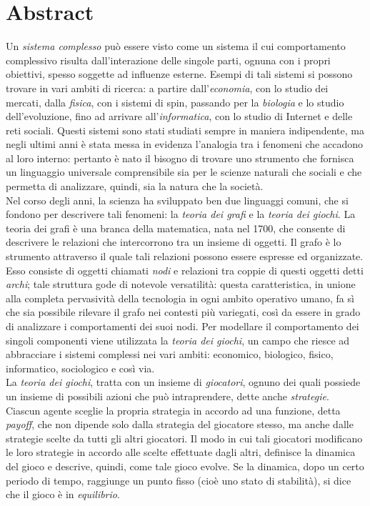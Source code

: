 \documentclass[11pt,oneside]{book}
\theoremstyle{plain}
\begin{document}


\vfill


\chapter*{Abstract}
Un \textit{sistema complesso} può essere visto come un sistema il cui comportamento complessivo risulta dall’interazione delle singole parti, ognuna con i propri obiettivi, spesso soggette ad influenze esterne. Esempi di tali sistemi si possono trovare in vari ambiti di ricerca: a partire dall’\textit{economia}, con lo studio dei mercati, dalla \textit{fisica}, con i sistemi di spin, passando per la \textit{biologia} e lo studio dell’evoluzione, fino ad arrivare all’\textit{informatica}, con lo studio di Internet e delle reti sociali. Questi sistemi sono stati studiati sempre in maniera indipendente, ma negli ultimi anni è stata messa in evidenza l’analogia tra i fenomeni che accadono al loro interno: pertanto è nato il bisogno di trovare uno strumento che fornisca un linguaggio universale comprensibile sia per le scienze naturali che sociali e che permetta di analizzare, quindi, sia la natura che la società.\\
Nel corso degli anni, la scienza ha sviluppato ben due linguaggi comuni, che si fondono per descrivere tali fenomeni: la \textit{teoria dei grafi} e la \textit{teoria dei giochi}. La teoria dei grafi è una branca della matematica, nata nel 1700, che consente di descrivere le relazioni che intercorrono tra un insieme di oggetti. Il grafo è lo strumento attraverso il quale tali relazioni possono essere espresse ed organizzate. Esso consiste di oggetti chiamati \textit{nodi} e relazioni tra coppie di questi oggetti detti \textit{archi}; tale struttura gode di notevole versatilità: questa caratteristica, in unione alla completa pervasività della tecnologia in ogni ambito operativo umano, fa sì che sia possibile rilevare il grafo nei contesti più variegati, così da essere in grado di analizzare i comportamenti dei suoi nodi. Per modellare il comportamento dei singoli componenti viene utilizzata la \textit{teoria dei giochi}, un campo che riesce ad abbracciare i sistemi complessi nei vari ambiti: economico, biologico, fisico, informatico, sociologico e così via.\\
La \textit{teoria dei giochi}, tratta con un insieme di \textit{giocatori}, ognuno dei quali possiede un insieme di possibili azioni che può intraprendere, dette anche \textit{strategie}. Ciascun agente sceglie la propria strategia in accordo ad una funzione, detta \textit{payoff}, che non dipende solo dalla strategia del giocatore stesso, ma anche dalle strategie scelte da tutti gli altri giocatori. Il modo in cui tali giocatori modificano le loro strategie in accordo alle scelte effettuate dagli altri, definisce la dinamica del gioco e descrive, quindi, come tale gioco evolve. Se la dinamica, dopo un certo periodo di tempo, raggiunge un punto fisso (cioè uno stato di stabilità), si dice che il gioco è in \textit{equilibrio}.\\
\end{document}
